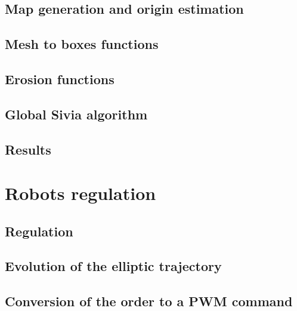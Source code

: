 \documentclass[12pt,fleqn]{report} %
\begin{document}
\section{Map generation and origin estimation}


\section{Mesh to boxes functions}


\section{Erosion functions}


\section{Global Sivia algorithm}


\section{Results}



\chapter{Robots regulation}

\section{Regulation}


\section{Evolution of the elliptic trajectory}


\section{Conversion of the order to a PWM command}



\end{document}
